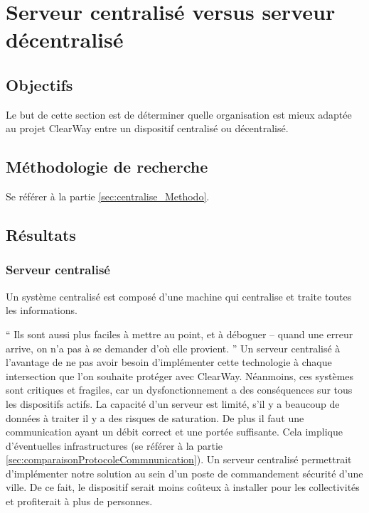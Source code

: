 
\section{Serveur centralisé versus serveur décentralisé}
\label{sec:centralise}

\subsection{Objectifs}
\label{sec:centralise_Objectifs}
Le but de cette section est de déterminer quelle organisation est mieux adaptée au projet ClearWay entre un dispositif centralisé ou décentralisé.

\subsection{Méthodologie de recherche}
\label{sec:centralise}
Se référer à la partie \ref{sec:centralise_Methodo}.

\subsection{Résultats}
\label{sec:centralise_Resultats}

\subsubsection{Serveur centralisé}
\label{sec:centralise_centralise}
Un système centralisé est composé d'une machine qui centralise et traite toutes les informations.

\enquote{
    Ils sont aussi plus faciles à mettre au point, et à déboguer – quand une erreur arrive, on n’a pas à se demander d’où elle provient. \cite{centraliser}
}
Un serveur centralisé à l'avantage de ne pas avoir besoin d'implémenter cette technologie à chaque intersection que l'on souhaite protéger avec ClearWay.
Néanmoins, ces systèmes sont critiques et fragiles, car un dysfonctionnement a des conséquences sur tous les dispositifs actifs.
La capacité d'un serveur est limité, s'il y a beaucoup de données à traiter il y a des risques de saturation.
De plus il faut une communication ayant un débit correct et une portée suffisante. Cela implique d'éventuelles infrastructures (se référer à la partie \ref{sec:comparaisonProtocoleCommnunication}).
Un serveur centralisé permettrait d'implémenter notre solution au sein d'un poste de commandement sécurité d'une ville. De ce fait,
le dispositif serait moins coûteux à installer pour les collectivités et profiterait à plus de personnes.

